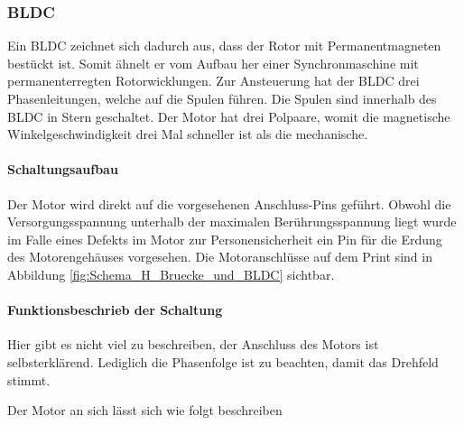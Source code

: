 \subsubsection{BLDC}
\label{subsubsec:BLDC}

Ein BLDC zeichnet sich dadurch aus, dass der Rotor mit Permanentmagneten bestückt ist. Somit ähnelt er vom Aufbau her einer Synchronmaschine mit permanenterregten Rotorwicklungen. Zur Ansteuerung hat der BLDC drei Phasenleitungen, welche auf die Spulen führen. Die Spulen sind innerhalb des BLDC in Stern geschaltet. Der Motor hat drei Polpaare, womit die magnetische Winkelgeschwindigkeit drei Mal schneller ist als die mechanische.

\paragraph{Schaltungsaufbau}\mbox{}

Der Motor wird direkt auf die vorgesehenen Anschluss-Pins geführt. Obwohl die Versorgungsspannung unterhalb der maximalen Berührungsspannung liegt wurde im Falle eines Defekts im Motor zur Personensicherheit ein Pin für die Erdung des Motorengehäuses vorgesehen.
Die Motoranschlüsse auf dem Print sind in Abbildung \ref{fig:Schema_H_Bruecke_und_BLDC} sichtbar.

\paragraph{Funktionsbeschrieb der Schaltung}\mbox{}

Hier gibt es nicht viel zu beschreiben, der Anschluss des Motors ist selbsterklärend. Lediglich die Phasenfolge ist zu beachten, damit das Drehfeld stimmt.

Der Motor an sich lässt sich wie folgt beschreiben \cite[S.36]{akm_servomotoren_2020}

